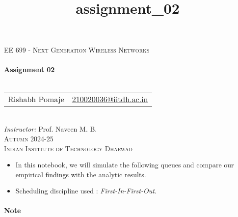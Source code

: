\documentclass[11pt]{article}
\title{assignment\_02}
\begin{document}
\vspace*{\fill}
\begin{center}
    \textsc{\LARGE EE 699 - Next Generation Wireless Networks}\\[0.6cm]
    \noindent\makebox[\linewidth]{\rule{0.7\paperwidth}{0.6pt}}\\[0.8cm]

    { \Huge \bfseries Assignment 02}\\[0.3cm]
    \noindent\makebox[\linewidth]{\rule{0.7\paperwidth}{0.6pt}}\\[0.8cm]

    \begin{tabular}{l l}
        \Large Rishabh Pomaje & \Large \href{mailto:210020036@iitdh.ac.in}{210020036@iitdh.ac.in} \\[0.5cm]
    \end{tabular}\\
    \Large \textit{Instructor: }Prof. Naveen M. B.\\[5cm]
    \textsc{\Large Autumn 2024-25\\[0.3cm] Indian Institute of Technology Dharwad}
\end{center}
\vspace*{\fill}

\newpage
\tableofcontents{}
\newpage

\begin{itemize}
\item
  In this notebook, we will simulate the following queues and compare
  our empirical findings with the analytic results.
\item
  Scheduling discipline used : \emph{First-In-First-Out}.
\end{itemize}

    \paragraph{\texorpdfstring{ Note }{ Note }}\label{note}
\end{document}
